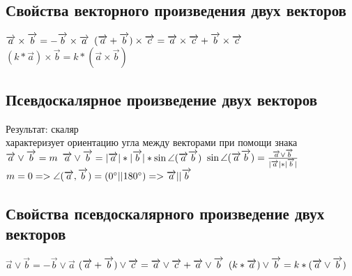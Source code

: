 \documentclass{book}
\begin{document}
\subsection{Свойства векторного произведения двух векторов}
$\overrightarrow{a}\times\overrightarrow{b}=-\overrightarrow{b}\times\overrightarrow{a}\\$
$(\overrightarrow{a}+\overrightarrow{b})\times\overrightarrow{c}=\overrightarrow{a}\times\overrightarrow{c}+\overrightarrow{b}\times\overrightarrow{c}\\$
$(k*\overrightarrow{a})\times\overrightarrow{b}=k*(\overrightarrow{a}\times\overrightarrow{b})$
\subsection{Псевдоскалярное произведение двух векторов}
Результат: скаляр\\
характеризует ориентацию угла между векторами при помощи знака\\
$\overrightarrow{a}\vee\overrightarrow{b}=m\\$
$\overrightarrow{a}\vee\overrightarrow{b}=|\overrightarrow{a}|*|\overrightarrow{b}|*\sin\angle(\overrightarrow{a}\overrightarrow{b})\\$
$\sin\angle(\overrightarrow{a}\overrightarrow{b})=\frac{\overrightarrow{a}\vee\overrightarrow{b}}{|\overrightarrow{a}|*|\overrightarrow{b}|}\\$
$m=0 => \angle(\overrightarrow{a},\overrightarrow{b})=(0^\circ||180^\circ) => \overrightarrow{a}||\overrightarrow{b}\\$
\subsection{Свойства псевдоскалярного произведение двух векторов}
$\overrightarrow{a}\vee\overrightarrow{b}=-\overrightarrow{b}\vee\overrightarrow{a}$
$(\overrightarrow{a}+\overrightarrow{b})\vee\overrightarrow{c}=\overrightarrow{a}\vee\overrightarrow{c}+\overrightarrow{a}\vee\overrightarrow{b}\\$
$(k*\overrightarrow{a})\vee\overrightarrow{b}=k*(\overrightarrow{a}\vee\overrightarrow{b})\\$
\end{document}
